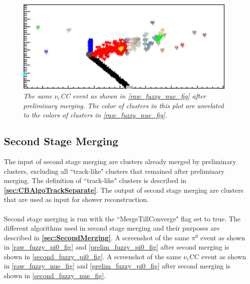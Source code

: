 \documentclass{article}
\begin{document}
\begin{figure}[h!]
\begin{center}
\includegraphics[width=110mm]{Figures/prelim_fuzzy_nue.png}
\end{center}
\caption{\textit{The same $\nu_e$CC event as shown in \autoref{raw_fuzzy_nue_fig} after preliminary merging. The color of clusters in this plot are unrelated to the colors of clusters in \autoref{raw_fuzzy_nue_fig}.}}
\label{prelim_fuzzy_nue_fig}
\end{figure}

\subsection{Second Stage Merging}
The input of second stage merging are clusters already merged by preliminary clusters, excluding all ``track-like" clusters that remained after preliminary merging. The definition of ``track-like" clusters is described in \textbf{\autoref{sec:CBAlgoTrackSeparate}}. The output of second stage merging are clusters that are used as input for shower reconstruction.\\\\
Second stage merging is run with the ``MergeTillConverge" flag set to true. The different algorithms used in second stage merging and their purposes are described in \textbf{\autoref{sec:SecondMerging}}. A screenshot of the same $\pi^0$ event as shown in \autoref{raw_fuzzy_pi0_fig} and \autoref{prelim_fuzzy_pi0_fig} after second merging is shown in \autoref{second_fuzzy_pi0_fig}.  A screenshot of the same $\nu_e$CC event as shown in \autoref{raw_fuzzy_nue_fig} and \autoref{prelim_fuzzy_pi0_fig} after second merging is shown in \autoref{second_fuzzy_nue_fig}.
\end{document}
